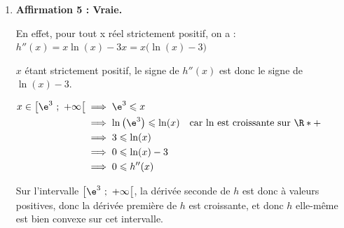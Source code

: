 \begin{enumerate}
	En égalant ces deux expressions du produit scalaire, on déduit :

	$10 = 4\sqrt{7}\cos\left(\widehat{\mathrm{BAC}}\right)$\quad qui équivaut à :\quad $\cos\left(\widehat{\mathrm{BAC}}\right) = \dfrac{10}{4\sqrt{7}} = \dfrac{5\sqrt{7}}{14}$.

	Il se trouve que le cosinus de 30\ensuremath{^\circ}{} est connu, il vaut $\dfrac{\sqrt{3}}{2}$ et est donc différent de celui trouvé ici : l'angle ne mesure dont pas 30\ensuremath{^\circ}.

\textbf{Remarque :} une valeur approchée d'une mesure de l'angle peut être obtenue à la calculatrice :

$\widehat{\mathrm{BAC}} = \arccos\left(\dfrac{5\sqrt{7}}{14}\right)\approx 19$\ensuremath{^\circ}.

\item \textbf{Affirmation 5 : Vraie.}

En effet, pour tout x réel strictement positif, on a :\quad $ h''(x) = x\ln(x) - 3x = x\big(\ln(x) - 3\big)$

$x$ étant strictement positif, le signe de $h''(x)$ est donc le signe de $\ln(x)-3$.

	$\begin{aligned}
		x \in \big[\e^{3}~;~+\infty\big[ &\implies \e^{3} \leqslant x\\
		&\implies \ln\big(\e^{3}\big) \leqslant \ln(x)\quad\text{car ln est croissante sur }\R*+\\
		&\implies 3\leqslant \ln(x)\\
		&\implies 0 \leqslant \ln(x) - 3\\
		&\implies 0\leqslant h''(x)
	\end{aligned}$

	Sur l'intervalle $\big[\e^{3}~;~+\infty\big[$, la dérivée seconde de $h$ est donc à valeurs positives, donc la dérivée première de $h$ est croissante, et donc $h$ elle-même est bien convexe sur cet intervalle.
\end{enumerate}
